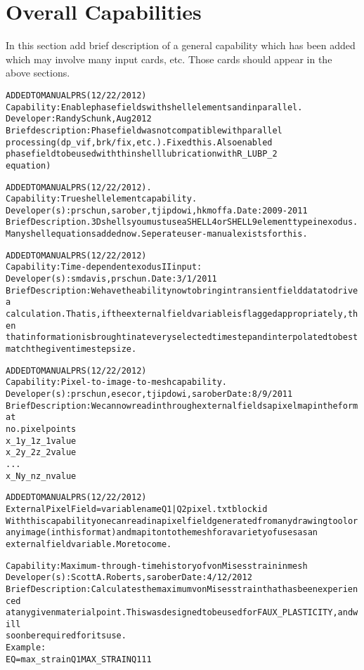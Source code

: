\documentclass{article}
\begin{document}
\section{Overall Capabilities}
In this section add brief description of a general capability which has been 
added which may involve many input cards, etc. Those cards should appear in the
above sections.  
\begin{alltt}

ADDED TO MANUAL PRS (12/22/2012)
Capability:  Enable phase fields with shell elements and in parallel.
Developer: Randy Schunk, Aug 2012
Brief description: Phase field was not compatible with parallel
processing (dp_vif, brk/fix, etc.).    Fixed this.   Also enabled
phase field to be used with thin shell lubrication with R_LUBP_2
equation)

ADDED TO MANUAL PRS (12/22/2012). 
Capability: True shell element capability.   
Developer(s): prschun, sarober, tjipdowi, hkmoffa.  Date: 2009-2011
Brief Description.  3D shells you must use a SHELL4 or SHELL9 element type in exodus.   
  Many shell equations added now. Seperate user-manual exists for this.  

ADDED TO MANUAL PRS (12/22/2012)
Capability: Time-dependent exodus II input:   
Developer(s): smdavis, prschun.  Date: 3/1/2011
Brief Description: We have the ability now to bring in transient field data to drive a 
  calculation.   That is, if the external field variable is flagged appropriately, then 
  that information is brought in at every selected time step and interpolated to best 
  match the given time step size.   

ADDED TO MANUAL PRS (12/22/2012)
Capability: Pixel-to-image-to-mesh capability.
Developer(s): prschun, esecor, tjipdowi, sarober Date:8/9/2011
Brief Description:  We can now read in through external fields a pixel map in the format 
  no. pixel points
  x_1 y_1 z_1 value
  x_2 y_2 z_2 value
  ...
  x_N y_n z_n value

ADDED TO MANUAL PRS (12/22/2012)
External Pixel Field = {variable name} {Q1|Q2} pixel.txt {blockid}
With this capability one can read in a pixel field generated from any drawing tool or 
  any image (in this format) and map it onto the mesh for a variety of uses as an 
  external field variable.  More to come. 

Capability:  Maximum-through-time history of von Mises strain in mesh
Developer(s):  Scott A. Roberts, sarober  Date:  4/12/2012
Brief Description:  Calculates the maximum von Mises strain that has been experienced
at any given material point.  This was designed to be used for FAUX_PLASTICITY, and will
soon be required for its use.
Example:  
EQ = max_strain       Q1 MAX_STRAIN    Q1 1               1


\end{alltt}
\end{document}
